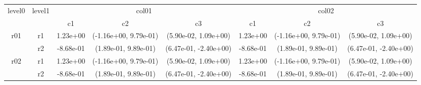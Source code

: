 \begin{tabular}{cccccccc}
\toprule
\multirow{2}{*}{level0} & \multirow{2}{*}{level1}&\multicolumn{3}{c}{col01}&\multicolumn{3}{c}{col02}\tabularnewline
\cmidrule(lr){3-5}
\cmidrule(lr){6-8}
&&c1&c2&c3&c1&c2&c3\tabularnewline
\midrule
\midrule
\multirow{2}{*}{r01}&r1&1.23e+00& (-1.16e+00, 9.79e-01)& (5.90e-02, 1.09e+00)&1.23e+00& (-1.16e+00, 9.79e-01)& (5.90e-02, 1.09e+00)\tabularnewline
&r2&-8.68e-01& (1.89e-01, 9.89e-01)& (6.47e-01, -2.40e+00)&-8.68e-01& (1.89e-01, 9.89e-01)& (6.47e-01, -2.40e+00)\tabularnewline
\midrule
\multirow{2}{*}{r02}&r1&1.23e+00& (-1.16e+00, 9.79e-01)& (5.90e-02, 1.09e+00)&1.23e+00& (-1.16e+00, 9.79e-01)& (5.90e-02, 1.09e+00)\tabularnewline
&r2&-8.68e-01& (1.89e-01, 9.89e-01)& (6.47e-01, -2.40e+00)&-8.68e-01& (1.89e-01, 9.89e-01)& (6.47e-01, -2.40e+00)\tabularnewline
\bottomrule
\end{tabular}
